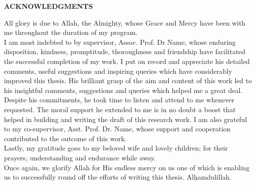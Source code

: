 \documentclass[12pt, a4paper, parskip=full]{memoir}
\begin{document}
\thispagestyle{empty}

\begin{center}
\fontsize{14bp}{16bp}
\textbf{\MakeUppercase{Acknowledgments}}\\[24pt]
\end{center}

\noindent All glory is due to Allah, the Almighty, whose Grace and Mercy have 
been with me throughout the duration of my program.\\

I am most indebted to by supervisor, Assoc. Prof. Dr Name, whose enduring
disposition, kindness, promptitude, thoroughness and friendship have 
facilitated the successful completion of my work. I put on record and 
appreciate his detailed comments, useful suggestions and inspiring queries 
which have considerably improved this thesis. His brilliant grasp of the aim 
and content of this work led to his insightful comments, suggestions and 
queries which helped me a great deal. Despite his commitments, he took time to 
listen and attend to me whenever requested. The moral support he extended to me 
is in no doubt a boost that helped in building and writing the draft of this 
research work. I am also grateful to my co-supervisor, Asst. Prof. Dr. Name, 
whose support and cooperation contributed to the outcome of this work.\\

Lastly, my gratitude goes to my beloved wife and lovely children; for their
prayers, understanding and endurance while away.\\

Once again, we glorify Allah for His endless mercy on us one of which is
enabling us to successfully round off the efforts of writing this thesis. 
Al\d{h}amdulillah.\\
\end{document}
